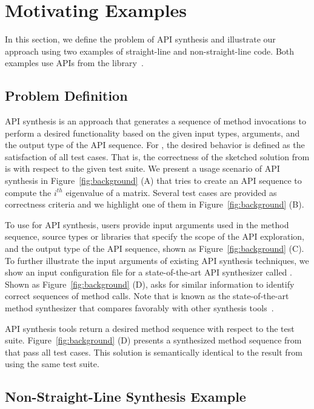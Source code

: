 \section{Motivating Examples}\label{sec:motivate}


In this section, we define the problem of API synthesis and illustrate our approach using two examples of straight-line and non-straight-line code. Both examples use APIs from the  library~\cite{math}. 

\subsection{Problem Definition}

API synthesis is an approach that generates a sequence of method invocations to perform a desired functionality based on the given input types, arguments, and the output type of the API sequence. For \tool, the desired behavior is defined as the satisfaction of all test cases. That is,  the correctness of the sketched solution from \tool is with respect to the given test suite. We present a usage scenario of API synthesis in Figure~\ref{fig:background} (A) that tries to create an API sequence to compute the $i^{th}$  eigenvalue of a matrix. Several test cases are provided as correctness criteria and we highlight one of them in Figure~\ref{fig:background} (B).  

To use \tool for API synthesis, users provide input arguments used in the method sequence, source types or libraries that specify the scope of the API exploration, and the output type of the API sequence, shown as Figure~\ref{fig:background} (C). 
To further illustrate the input arguments of existing API synthesis techniques, we show an input configuration file  for a state-of-the-art API synthesizer called \spt. Shown as Figure~\ref{fig:background} (D), \spt asks for similar information to identify correct sequences of method calls. Note that \spt is known as the state-of-the-art method synthesizer that compares favorably with other synthesis tools~\cite{codehint:icse14, insynth:cav11}. 

API synthesis tools return a desired method sequence with respect to the test suite.  Figure~\ref{fig:background} (D) presents a synthesized method sequence from \tool that pass all test cases. This solution is semantically identical to the result from \spt using the same test suite. 

\subsection{Non-Straight-Line Synthesis Example }

